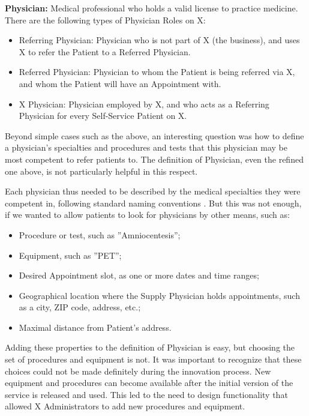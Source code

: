 \documentclass[graybox,envcountchap,sectrefs]{svmono}
\begin{document}
\begin{svgraybox}
\textbf{Physician:} Medical professional who holds a valid license to practice medicine. There are the following types of Physician Roles on X:
\begin{itemize}
	\item Referring Physician: Physician who is not part of X (the business), and uses X to refer the Patient to a Referred Physician.
	\item Referred Physician: Physician to whom the Patient is being referred via X, and whom the Patient will have an Appointment with. 
	\item X Physician: Physician employed by X, and who acts as a Referring Physician for every Self-Service Patient on X.
\end{itemize}
\end{svgraybox}

Beyond simple cases such as the above, an interesting question was how to define a physician's specialties and procedures and tests that this physician may be most competent to refer patients to. The definition of Physician, even the refined one above, is not particularly helpful in this respect. 

Each physician thus needed to be described by the medical specialties they were competent in, following standard naming conventions \cite{wikipedia-specialty-medicine}. But this was not enough, if we wanted to allow patients to look for physicians by other means, such as:
\begin{itemize}
	\item Procedure or test, such as ''Amniocentesis'';
	\item Equipment, such as ''PET'';
	\item Desired Appointment slot, as one or more dates and time ranges;
	\item Geographical location where the Supply Physician holds appointments, such as a city, ZIP code, address, etc.;
	\item Maximal distance from Patient’s address.
\end{itemize}

Adding these properties to the definition of Physician is easy, but choosing the set of procedures and equipment is not. It was important to recognize that these choices could not be made definitely during the innovation process. New equipment and procedures can become available after the initial version of the service is released and used. This led to the need to design functionality that allowed X Administrators to add new procedures and equipment.
\end{document}

